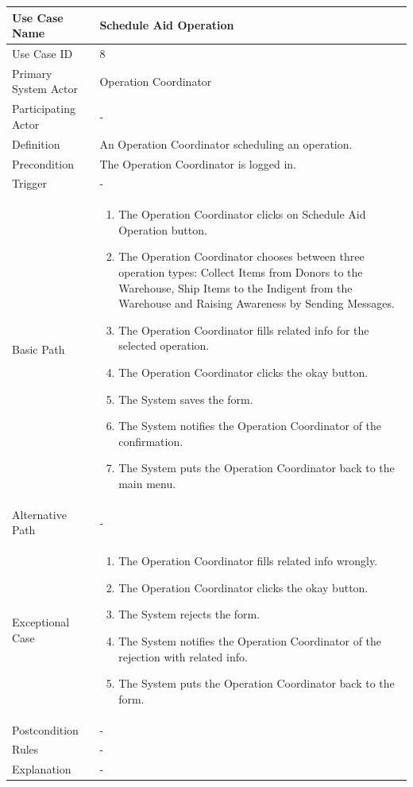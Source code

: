 \documentclass[a4paper,12pt]{report}
\begin{document}
		\begin{tabular}{|m{4cm}|m{11.5cm}|}
			\hline
				Use Case Name & Schedule Aid Operation\\
			\hline
				Use Case ID & 8\\
			\hline
				Primary System Actor & Operation Coordinator\\
			\hline
				Participating Actor & -\\
			\hline
				Definition & An Operation Coordinator scheduling an operation.\\
			\hline
				Precondition & The Operation Coordinator is logged in.\\
			\hline
				Trigger & -\\
			\hline
				Basic Path & \begin{enumerate}
					\item The Operation Coordinator clicks on Schedule Aid Operation button.
					\item The Operation Coordinator chooses between three operation types: Collect Items from Donors to the Warehouse, Ship Items to the Indigent from the Warehouse and Raising Awareness by Sending Messages.
					\item The Operation Coordinator fills related info for the selected operation.
					\item The Operation Coordinator clicks the okay button.
					\item The System saves the form.
					\item The System notifies the Operation Coordinator of the confirmation.
					\item The System puts the Operation Coordinator back to the main menu.
				\end{enumerate}		
				\\
			\hline
				Alternative Path & -\\
			\hline
				Exceptional Case & \begin{enumerate}
					\item The Operation Coordinator fills related info wrongly.
					\item The Operation Coordinator clicks the okay button.
					\item The System rejects the form.
					\item The System notifies the Operation Coordinator of the rejection with related info.
					\item The System puts the Operation Coordinator back to the form.
				\end{enumerate}
				\\
			\hline
				Postcondition & -\\
			\hline
				Rules & -\\
			\hline
				Explanation & -\\
			\hline
		\end{tabular}
\end{document}
